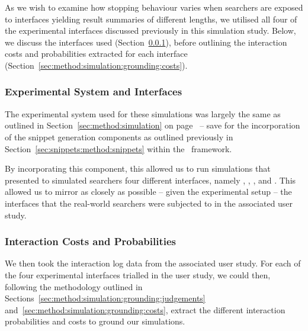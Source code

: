 As we wish to examine how stopping behaviour varies when searchers are exposed to interfaces yielding result summaries of different lengths, we utilised all four of the experimental interfaces discussed previously in this simulation study. Below, we discuss the interfaces used (Section~\ref{sec:snippets:simulations:method:interfaces}), before outlining the interaction costs and probabilities extracted for each interface (Section~\ref{sec:method:simulation:grounding:costs}).

\subsubsection{Experimental System and Interfaces}\label{sec:snippets:simulations:method:interfaces}
The experimental system used for these simulations was largely the same as outlined in Section~\ref{sec:method:simulation} on page~\pageref{sec:method:simulation} -- save for the incorporation of the snippet generation components as outlined previously in Section~\ref{sec:snippets:method:snippets} within the \simiir~framework.

By incorporating this component, this allowed us to run simulations that presented to simulated searchers four different interfaces, namely , , , and . This allowed us to mirror as closely as possible -- given the experimental setup -- the interfaces that the real-world searchers were subjected to in the associated user study.

\subsubsection{Interaction Costs and Probabilities}\label{sec:snippets:simulations:method:costs}
We then took the interaction log data from the associated user study. For each of the four experimental interfaces trialled in the user study, we could then, following the methodology outlined in Sections~\ref{sec:method:simulation:grounding:judgements} and~\ref{sec:method:simulation:grounding:costs}, extract the different interaction probabilities and costs to ground our simulations.

